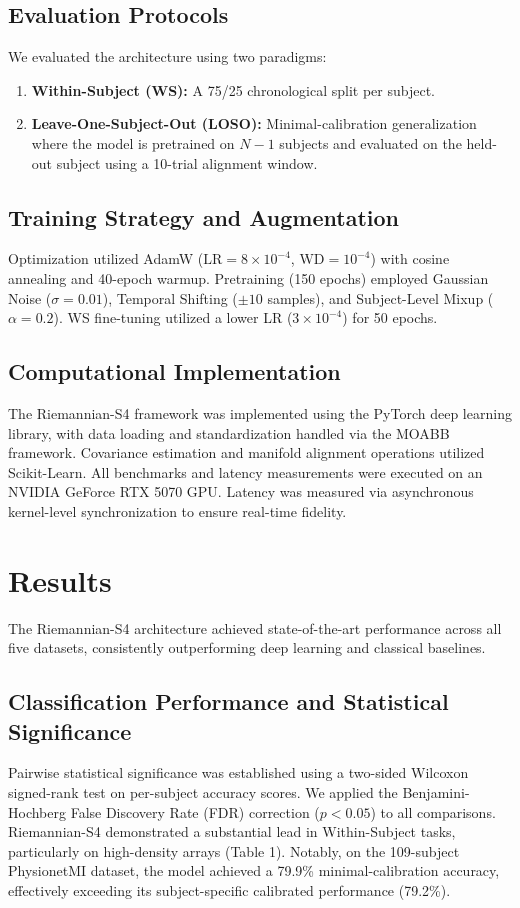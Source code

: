 \documentclass[11pt,a4paper]{article}
\begin{document}
\subsection{Evaluation Protocols}
We evaluated the architecture using two paradigms:
\begin{enumerate}
    \item \textbf{Within-Subject (WS):} A 75/25 chronological split per subject.
    \item \textbf{Leave-One-Subject-Out (LOSO):} Minimal-calibration generalization where the model is pretrained on $N-1$ subjects and evaluated on the held-out subject using a 10-trial alignment window.
\end{enumerate}

\subsection{Training Strategy and Augmentation}
Optimization utilized AdamW ($\text{LR}=8\times10^{-4}$, $\text{WD}=10^{-4}$) with cosine annealing and 40-epoch warmup. Pretraining (150 epochs) employed Gaussian Noise ($\sigma=0.01$), Temporal Shifting ($\pm 10$ samples), and Subject-Level Mixup ($\alpha=0.2$). WS fine-tuning utilized a lower LR ($3\times10^{-4}$) for 50 epochs.

\subsection{Computational Implementation}
The Riemannian-S4 framework was implemented using the PyTorch deep learning library, with data loading and standardization handled via the MOABB framework. Covariance estimation and manifold alignment operations utilized Scikit-Learn. All benchmarks and latency measurements were executed on an NVIDIA GeForce RTX 5070 GPU. Latency was measured via asynchronous kernel-level synchronization to ensure real-time fidelity.

\section{Results}
The Riemannian-S4 architecture achieved state-of-the-art performance across all five datasets, consistently outperforming deep learning and classical baselines. 

\subsection{Classification Performance and Statistical Significance}
Pairwise statistical significance was established using a two-sided Wilcoxon signed-rank test on per-subject accuracy scores. We applied the Benjamini-Hochberg False Discovery Rate (FDR) correction ($p < 0.05$) to all comparisons. Riemannian-S4 demonstrated a substantial lead in Within-Subject tasks, particularly on high-density arrays (Table 1). Notably, on the 109-subject PhysionetMI dataset, the model achieved a 79.9\% minimal-calibration accuracy, effectively exceeding its subject-specific calibrated performance (79.2\%).
\end{document}

